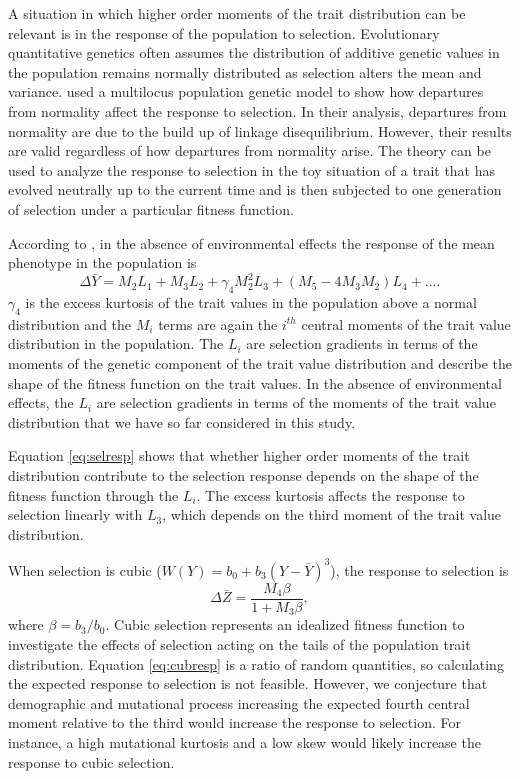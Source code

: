 A situation in which higher order moments of the trait distribution can be
relevant is in the response of the population to selection. Evolutionary
quantitative genetics often assumes the distribution of additive genetic values
in the population remains normally distributed as selection alters the mean and
variance. \citet{Turelli1990} used a multilocus population genetic model to show
how departures from normality affect the response to selection. In their
analysis, departures from normality are due to the build up of linkage
disequilibrium. However, their results are valid regardless of how departures
from normality arise. The \citet{Turelli1990} theory can be used to analyze the
response to selection in the toy situation of a trait that has evolved neutrally
up to the current time and is then subjected to one generation of selection
under a particular fitness function.

According to \citet{Turelli1990}, in the absence of environmental effects the
response of the mean phenotype in the population is
\begin{equation}
  \label{eq:selresp}
  \Delta \bar{Y} = M_2L_1 + M_3L_2 + \gamma_4M^2_2L_3 +
  \left( M_5-4M_3M_2\right)L_4 + \ldots.
\end{equation}
$\gamma_4$ is the excess kurtosis of the trait values in the population above a
normal distribution and the $M_i$ terms are again the $i^{th}$ central moments
of the trait value distribution in the population. The $L_i$ are selection
gradients in terms of the moments of the genetic component of the trait value
distribution and describe the shape of the fitness function on the trait values.
In the absence of environmental effects, the $L_i$ are selection gradients in
terms of the moments of the trait value distribution that we have so far
considered in this study.

Equation \eqref{eq:selresp} shows that whether higher order moments of the trait
distribution contribute to the selection response depends on the shape of the
fitness function through the $L_i$. The excess kurtosis affects the response to
selection linearly with $L_3$, which depends on the third moment of the trait
value distribution.

When selection is cubic ($W(Y) = b_0 + b_3(Y-\bar{Y})^3$), the response to
selection is
\begin{equation}
  \label{eq:cubresp}
  \Delta \bar{Z} = \frac{M_4\beta}{1 + M_3\beta},
\end{equation}
where $\beta=b_3/b_0$. Cubic selection represents an idealized fitness function
to investigate the effects of selection acting on the tails of the population
trait distribution. Equation \eqref{eq:cubresp} is a ratio of random quantities,
so calculating the expected response to selection is not feasible. However, we
conjecture that demographic and mutational process increasing the expected
fourth central moment relative to the third would increase the response to
selection. For instance, a high mutational kurtosis and a low skew would likely
increase the response to cubic selection.

